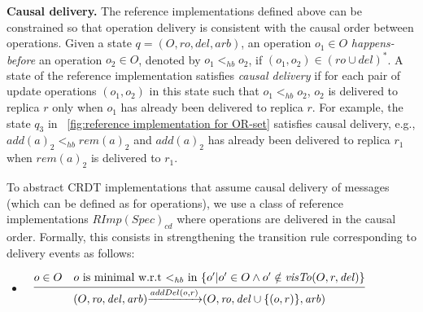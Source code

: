 \noindent
{\bf Causal delivery.} The reference implementations defined above can be constrained so that operation delivery is consistent with the causal order between operations.
Given a state $q = (O,\mathit{ro},\mathit{del},\mathit{arb})$, an operation $o_1\in O$ \emph{happens-before} an operation $o_2\in O$, denoted by $o_1 <_{\mathit{hb}} o_2$, if $(o_1,o_2) \in (\mathit{ro}\cup \mathit{del})^*$. A state of the reference implementation satisfies \emph{causal delivery} if for each pair of update operations $(o_1,o_2)$ in this state such that $o_1 <_{\mathit{hb}} o_2$, $o_2$ is delivered to replica $r$ only when $o_1$ has already been delivered to replica $r$. For example, the state $q_3$ in \figurename~\ref{fig:reference implementation for OR-set} satisfies causal delivery, e.g., $add(a)_2 <_{\mathit{hb}} rem(a)_2$ and $add(a)_2$ has already been delivered to replica $r_1$ when $rem(a)_2$ is delivered to $r_1$.

To abstract CRDT implementations that assume causal delivery of messages (which can be defined as for operations), we use a class of reference implementations $\mathit{RImp}(\mathit{Spec})_{\mathit{cd}}$ where operations are delivered in the causal order. Formally, this consists in strengthening the transition rule corresponding to delivery events as follows:


\begin {itemize}
\setlength{\itemsep}{0.5pt}
\item[-] $\begin{array}{l c} \bigfrac{o \in O\quad o\mbox{ is minimal w.r.t $<_{\mathit{hb}}$ in }\{ o' \vert o' \in O \wedge o' \notin \mathit{visTo}(O,r,\mathit{del}) \}} {(O,\mathit{ro},\mathit{del},\mathit{arb}) {\xrightarrow{addDel(o,r)}} (O,\mathit{ro},\mathit{del} \cup \{ (o,r) \},\mathit{arb})} \end{array}$
\end{itemize}






